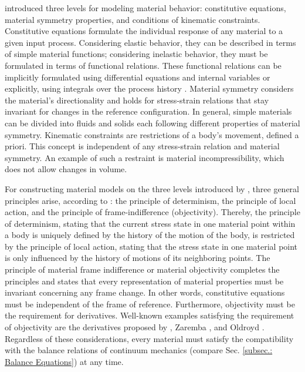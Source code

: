\documentclass[preprint,12pt,authoryear]{elsarticle}
\begin{document}
\citet{Haupt.2000} introduced three levels for modeling material behavior: constitutive equations, material symmetry properties, and conditions of kinematic constraints. Constitutive equations formulate the individual response of any material to a given input process. Considering elastic behavior, they can be described in terms of simple material functions; considering inelastic behavior, they must be formulated in terms of functional relations. These functional relations can be implicitly formulated using differential equations and internal variables \cite{Coleman.1967,Lubliner.1973,Maugin.1994} or explicitly, using integrals over the process history \cite{Lockett.1972}. Material symmetry considers the material's directionality and holds for stress-strain relations that stay invariant for changes in the reference configuration. In general, simple materials can be divided into fluids and solids each following different properties of material symmetry. Kinematic constraints are restrictions of a body's movement, defined a priori. This concept is independent of any stress-strain relation and material symmetry. An example of such a restraint is material incompressibility, which does not allow changes in volume.

For constructing material models on the three levels introduced by \citet{Haupt.2000}, three general principles arise, according to \citet{Truesdell.1960,Truesdell.1965}: the principle of determinism, the principle of local action, and the principle of frame-indifference (objectivity). Thereby, the principle of determinism, stating that the current stress state in one material point within a body is uniquely defined by the history of the motion of the body, is restricted by the principle of local action, stating that the stress state in one material point is only influenced by the history of motions of its neighboring points. The principle of material frame indifference or material objectivity completes the principles and states that every representation of material properties must be invariant concerning any frame change. In other words, constitutive equations must be independent of the frame of reference. Furthermore, objectivity must be the requirement for derivatives. Well-known examples satisfying the requirement of objectivity are the derivatives proposed by \cite{Jaumann.1906}, Zaremba \cite{Zaremba.1903}, and Oldroyd \cite{Oldroyd.1950}. Regardless of these considerations, every material must satisfy the compatibility with the balance relations of continuum mechanics (compare Sec. \ref{subsec.: Balance Equations}) at any time.
\end{document}
